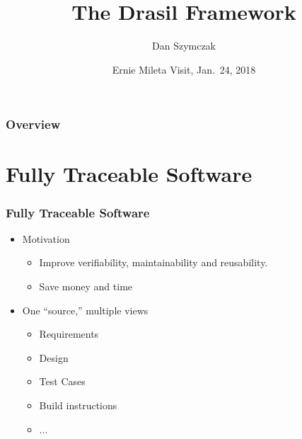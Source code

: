 \documentclass{beamer}
\title[\pgfuseimage{logo}]  %
{The Drasil Framework}
\author[Slide \thepage~of \pageref{TotPages}] %
{Dan Szymczak}
\institute[McMaster University] %
{
  Computing and Software Department\\
  Faculty of Engineering\\
  McMaster University
}
\date[Jan 24, 2018] %
{Ernie Mileta Visit, Jan.\ 24, 2018}
\begin{document}
\begin{frame}

\titlepage

\end{frame}


\begin{frame}

\frametitle{Overview}
\tableofcontents


\end{frame}


\section[FTS]{Fully Traceable Software} %



\begin{frame}

\frametitle{Fully Traceable Software}

\begin{itemize}
\item Motivation
\begin{itemize}
\item Improve verifiability, maintainability and reusability.
\item Save money and time%
\end{itemize}
\item One ``source,'' multiple views
\begin{itemize}
\item Requirements%
\item Design
\item Test Cases
\item Build instructions
\item ...
\end{itemize}
\end{itemize}
\end{frame}
\end{document}
